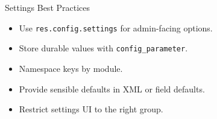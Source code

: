 \begin{frame}{Settings Best Practices}
	\begin{itemize}
		\item Use \texttt{res.config.settings} for admin-facing options.
		\item Store durable values with \texttt{config\_parameter}.
		\item Namespace keys by module.
		\item Provide sensible defaults in XML or field defaults.
		\item Restrict settings UI to the right group.
	\end{itemize}
\end{frame}
